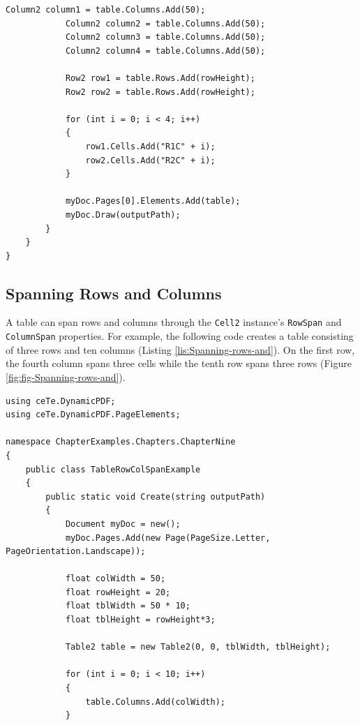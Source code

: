 \documentclass[american]{tufte-book}
\numberwithin{equation}{section}
\numberwithin{figure}{section}
\begin{document}
{\begin{lstlisting}[caption={A simple table example.},label={lis:A-simple-table},basicstyle={\footnotesize\ttfamily},breaklines=true]
            Column2 column1 = table.Columns.Add(50);
            Column2 column2 = table.Columns.Add(50);
            Column2 column3 = table.Columns.Add(50);
            Column2 column4 = table.Columns.Add(50);

            Row2 row1 = table.Rows.Add(rowHeight);
            Row2 row2 = table.Rows.Add(rowHeight);

            for (int i = 0; i < 4; i++)
            {
                row1.Cells.Add("R1C" + i);
                row2.Cells.Add("R2C" + i);
            }

            myDoc.Pages[0].Elements.Add(table);
            myDoc.Draw(outputPath);
        }
    }
}
\end{lstlisting}
\leavevmode\egroup


\subsection{Spanning Rows and Columns}

A table can span rows and columns through the \texttt{Cell2} instance's
\texttt{RowSpan} and \texttt{ColumnSpan} properties. For example,
the following code creates a table consisting of three rows and ten
columns (Listing \ref{lis:Spanning-rows-and}). On the first row,
the fourth column spans three cells while the tenth row spans three
rows (Figure \ref{fig:fig-Spanning-rows-and}).

\bgroup{}
\begin{lstlisting}[caption={Spanning rows and columns.},label={lis:Spanning-rows-and},basicstyle={\footnotesize\ttfamily},breaklines=true]
using ceTe.DynamicPDF;
using ceTe.DynamicPDF.PageElements;

namespace ChapterExamples.Chapters.ChapterNine
{
    public class TableRowColSpanExample
    {
        public static void Create(string outputPath)
        {
            Document myDoc = new();
            myDoc.Pages.Add(new Page(PageSize.Letter, PageOrientation.Landscape));

            float colWidth = 50;
            float rowHeight = 20;
            float tblWidth = 50 * 10;
            float tblHeight = rowHeight*3;

            Table2 table = new Table2(0, 0, tblWidth, tblHeight);
           
            for (int i = 0; i < 10; i++)
            {
                table.Columns.Add(colWidth);
            }


\end{lstlisting}}
\end{document}
